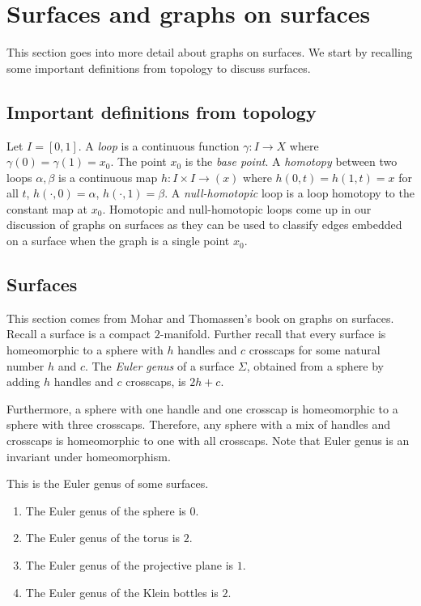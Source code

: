 \section{Surfaces and graphs on surfaces}

This section goes into more detail about graphs on surfaces. We start by recalling some important definitions from topology to discuss surfaces. 

\subsection{Important definitions from topology}

Let $I = [0, 1]$.
A \textit{loop} is a continuous function $\gamma : I \rightarrow X$ where $\gamma(0) = \gamma(1) = x_0$. The point $x_0$ is the \textit{base point}. A \textit{homotopy} between two loops $\alpha, \beta$ is a continuous map $h : I \times I \rightarrow (x)$ where $h(0, t) = h(1, t) = x$ for all $t$, $h(\cdot, 0) = \alpha$, $h(\cdot, 1) = \beta$. A \textit{null-homotopic} loop is a loop homotopy to the constant map at $x_0$. Homotopic and null-homotopic loops come up in our discussion of graphs on surfaces as they can be used to classify edges embedded on a surface when the graph is a single point $x_0$. 

\subsection{Surfaces}

This section comes from Mohar and Thomassen's\cite{moharGraphsSurfaces2001} book on graphs on surfaces. Recall a surface is a compact $2$-manifold. Further recall that every surface is homeomorphic to a sphere with $h$ handles and $c$ crosscaps for some natural number $h$ and $c$. The \textit{Euler genus} of a surface \(\Sigma\), obtained from a sphere by adding \(h\) handles and \(c\) crosscaps, is \(2h + c\).

Furthermore, a sphere with one handle and one crosscap is homeomorphic to a sphere with three crosscaps. Therefore, any sphere with a mix of handles and crosscaps is homeomorphic to one with all crosscaps. Note that Euler genus is an invariant under homeomorphism. 

\begin{example}
	This is the Euler genus of some surfaces.
	\begin{enumerate}
		\item The Euler genus of the sphere is \(0\).
		\item The Euler genus of the torus is \(2\).
		\item The Euler genus of the projective plane is \(1\). 
		\item The Euler genus of the Klein bottles is \(2\). 
	\end{enumerate}
\end{example}

